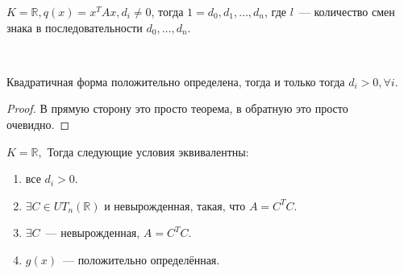 \begin{follow}
    $K = \mathbb{R}, q(x) = x^T A x, d_i \not= 0$, тогда  $1 = d_0,d_1,\dots, d_n$, где $l$~--- количество смен знака в
    последовательности $d_0,\dots,d_n$.
\end{follow}
\\\quad
\begin{follow}
    Квадратичная форма положительно определена, тогда и только тогда $d_i > 0, \forall i$.
\end{follow}
\begin{proof}
    В прямую сторону это просто теорема, в обратную это просто очевидно.
\end{proof}
 \begin{theorem}
     $K = \mathbb{R}, $ 
     Тогда следующие условия эквивалентны:
     \begin{enumerate}
         \item все $d_i > 0$.
         \item $\exists C \in UT_n(\mathbb{R})$ и невырожденная, такая, что $A = C^T C$.
         \item  $\exists C$~--- невырожденная, $A = C^T C$.
         \item  $g(x)$~--- положительно определённая.
     \end{enumerate}
\end{theorem}
